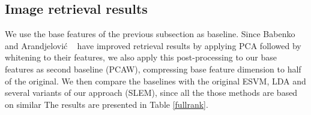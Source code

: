 



\subsection{Image retrieval results}
We use the base features of the previous subsection as baseline. Since Babenko \etal~\cite{babenko15} and Arandjelovi\'c \etal~\cite{Arandjelovic15} have improved retrieval results by applying PCA followed by whitening to their features, we also apply this post-processing to our base features as second baseline (PCAW), compressing base feature dimension to half of the original. We then compare the baselines with the original ESVM, LDA and several variants of our approach (SLEM), since all the those methods are based on similar  The results are presented in Table \ref{fullrank}. 

